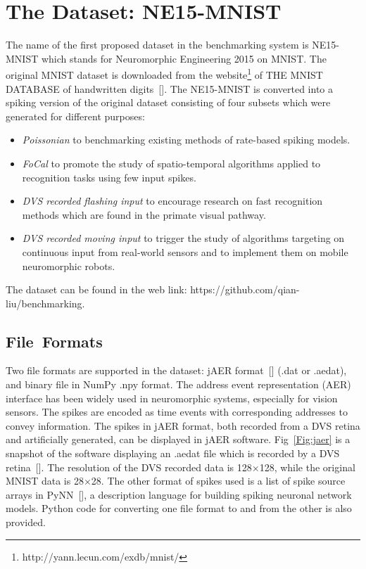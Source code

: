 \section{The Dataset: NE15-MNIST}
\label{sec:data}
The name of the first proposed dataset in the benchmarking system is NE15-MNIST which stands for Neuromorphic Engineering 2015 on MNIST.
The original MNIST dataset is downloaded from the website\footnote{http://yann.lecun.com/exdb/mnist/} of THE MNIST DATABASE of handwritten digits~[\cite{lecun_gradient-based_1998}].
The NE15-MNIST is converted into a spiking version of the original dataset consisting of four subsets which were generated for different purposes:
\begin{itemize}
	\item \textit{Poissonian}
	to benchmarking existing methods of rate-based spiking models.
	\item \textit{FoCal}
	to promote the study of spatio-temporal algorithms applied to recognition tasks using few input spikes.
	\item \textit{DVS recorded flashing input}
	to encourage research on fast recognition methods which are found in the primate visual pathway.
	\item \textit{DVS recorded moving input}
	to trigger the study of algorithms targeting on continuous input from real-world sensors and to implement them on mobile neuromorphic robots.
\end{itemize}
The dataset can be found in the web link: https://github.com/qian-liu/benchmarking.
\subsection{File~Formats}
	
Two file formats are supported in the dataset: jAER format~[\cite{delbruck2008frame}] (.dat or .aedat), and binary file in NumPy .npy format.
The  address event representation (AER) interface has been widely used in neuromorphic systems, especially for vision sensors.
The spikes are encoded as time events with corresponding addresses to convey information.
The spikes in jAER format, both recorded from a DVS retina and artificially generated, can be displayed in jAER software.
Fig~\ref{Fig:jaer} is a snapshot of the software displaying an .aedat file which is recorded by a DVS retina~[\cite{serrano-gotarredona_128_2013}].
The resolution of the DVS recorded data is 128$\times$128, while the original MNIST data is 28$\times$28.
The other format of spikes used is a list of spike source arrays in PyNN~[\cite{davison2008pynn}], a description language for building spiking neuronal network models.
Python code for converting one file format to and from the other is also provided.

